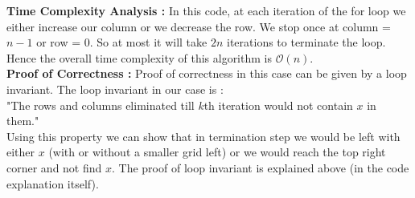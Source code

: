 \documentclass[14pt]{article}
\begin{document}
			\textbf{Time Complexity Analysis : }In this code, at each iteration of the for loop we either increase our column or we decrease the row. We stop once at column = $n-1$ or row = $0$. So at most it will take $2n$ iterations to terminate the loop. Hence the overall time complexity of this algorithm is $\mathcal{O}(n)$.\\
			\linebreak
			\textbf{Proof of Correctness : }Proof of correctness in this case can be given by a loop invariant. The loop invariant in our case is : \\
			"The rows and columns eliminated till $k$th iteration would not contain $x$ in them."\\
			Using this property we can show that in termination step we would be left with either $x$ (with or without a smaller grid left) or we would reach the top right corner and not find $x$.
			The proof of loop invariant is explained above (in the code explanation itself).
			
			
\end{document}
